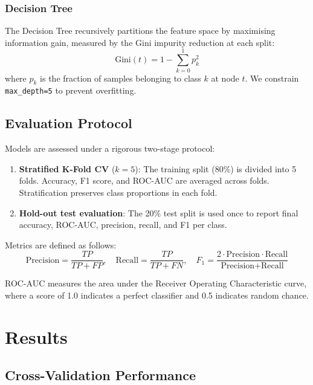 \documentclass[conference]{IEEEtran}
\begin{document}
\subsubsection{Decision Tree}

The Decision Tree recursively partitions the feature space by maximising
information gain, measured by the Gini impurity reduction at each split:
\begin{equation}
  \text{Gini}(t) = 1 - \sum_{k=0}^{1} p_k^2
  \label{eq:gini}
\end{equation}
where $p_k$ is the fraction of samples belonging to class $k$ at node $t$.
We constrain \texttt{max\_depth=5} to prevent overfitting.

\subsection{Evaluation Protocol}

Models are assessed under a rigorous two-stage protocol:

\begin{enumerate}
  \item \textbf{Stratified K-Fold CV} ($k=5$): The training split (80\%) is
        divided into 5 folds.  Accuracy, F1 score, and ROC-AUC are averaged
        across folds.  Stratification preserves class proportions in each fold.
  \item \textbf{Hold-out test evaluation}: The 20\% test split is used once to
        report final accuracy, ROC-AUC, precision, recall, and F1 per class.
\end{enumerate}

Metrics are defined as follows:
\begin{equation}
  \text{Precision} = \frac{TP}{TP + FP},\quad
  \text{Recall} = \frac{TP}{TP + FN},\quad
  F_1 = \frac{2 \cdot \text{Precision} \cdot \text{Recall}}{\text{Precision} + \text{Recall}}
  \label{eq:metrics}
\end{equation}

ROC-AUC measures the area under the Receiver Operating Characteristic curve,
where a score of 1.0 indicates a perfect classifier and 0.5 indicates random
chance.

\section{Results}

\subsection{Cross-Validation Performance}
\end{document}
